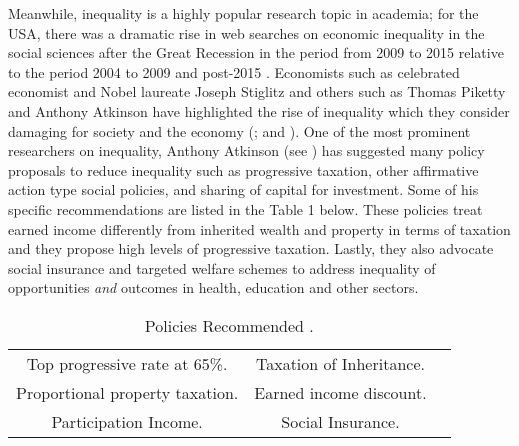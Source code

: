 \documentclass[12pt]{article}
\newcommand{\1}{\mathbbm 1}
\begin{document}
	
	Meanwhile, inequality is a highly popular research topic in academia; for the USA, there was a dramatic rise in web searches on economic inequality in the social sciences after the Great Recession in the period from 2009 to 2015 relative to the period 2004 to 2009 and post-2015 \cite{googletrendsinequality}. Economists such as celebrated economist and Nobel laureate Joseph Stiglitz and others such as Thomas Piketty and Anthony Atkinson have highlighted the rise of inequality which they consider damaging for society and the economy (\cite{stiglitz2012}; \cite{piketty2017capital} and \cite{piketty2022brief}). One of the most prominent researchers on inequality, Anthony Atkinson (see \cite{atkinson2015inequality}) has suggested many policy proposals to reduce inequality such as progressive  taxation,  other affirmative action type social policies,  and  sharing  of  capital for investment. Some of his specific recommendations are listed in the Table 1 below. These policies treat earned income differently from inherited wealth and property in terms of taxation and they propose high levels of progressive taxation. Lastly, they also advocate social insurance and targeted welfare schemes to address inequality of opportunities \textit{and} outcomes in health, education and other sectors.
	
	\begin{table} [h!]
	\begin{center}
		\begin{tabular}{ |c | c | c | }
			\hline
			Top progressive rate at 65\%. & Taxation of Inheritance. \\
			Proportional property  taxation.  & Earned income discount.\\
			Participation Income. & Social Insurance.\\
			\hline
		\end{tabular}
	\end{center}
\caption{Policies Recommended \cite{atkinson2015inequality}.}
\label {table:1}
\end{table}
	
	
	
	

	
	
\end{document}
